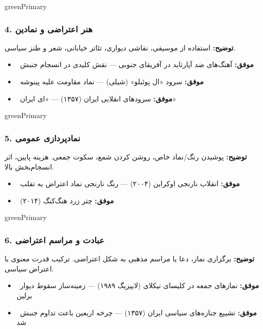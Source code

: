 \documentclass[a4paper,12pt]{article}
\newcommand{\success}[1]{\textcolor{greenPrimary}{\faCheckCircle\ \textbf{موفق:}} #1}
\newcommand{\methodnum}[1]{\textcolor{purpleLight}{\textbf{#1.}}}
\begin{document}
\begin{methodcard}{greenPrimary}
\subsubsection{\methodnum{4} هنر اعتراضی و نمادین}
\textbf{توضیح:} استفاده از موسیقی، نقاشی دیواری، تئاتر خیابانی، شعر و طنز سیاسی.

\begin{itemize}[label=\textcolor{greenPrimary}{\faCheckCircle}]
  \item \success{آهنگ‌های ضد آپارتاید در آفریقای جنوبی — نقش کلیدی در انسجام جنبش}
  \item \success{سرود «ال پوئبلو» (شیلی) — نماد مقاومت علیه پینوشه}
  \item \success{سرودهای انقلابی ایران (۱۳۵۷) — «ای ایران»}
\end{itemize}
\end{methodcard}

\begin{methodcard}{greenPrimary}
\subsubsection{\methodnum{5} نمادپردازی عمومی}
\textbf{توضیح:} پوشیدن رنگ/نماد خاص، روشن کردن شمع، سکوت جمعی. هزینه پایین، اثر انسجام‌بخش بالا.

\begin{itemize}[label=\textcolor{greenPrimary}{\faCheckCircle}]
  \item \success{انقلاب نارنجی اوکراین (۲۰۰۴) — رنگ نارنجی نماد اعتراض به تقلب}
  \item \success{چتر زرد هنگ‌کنگ (۲۰۱۴)}
\end{itemize}
\end{methodcard}

\begin{methodcard}{greenPrimary}
\subsubsection{\methodnum{6} عبادت و مراسم اعتراضی}
\textbf{توضیح:} برگزاری نماز، دعا یا مراسم مذهبی به شکل اعتراضی. ترکیب قدرت معنوی با اعتراض سیاسی.

\begin{itemize}[label=\textcolor{greenPrimary}{\faCheckCircle}]
  \item \success{نمازهای جمعه در کلیسای نیکلای (لایپزیگ ۱۹۸۹) — زمینه‌ساز سقوط دیوار برلین}
  \item \success{تشییع جنازه‌های سیاسی ایران (۱۳۵۷) — چرخه اربعین باعث تداوم جنبش شد}
\end{itemize}
\end{methodcard}
\end{document}
